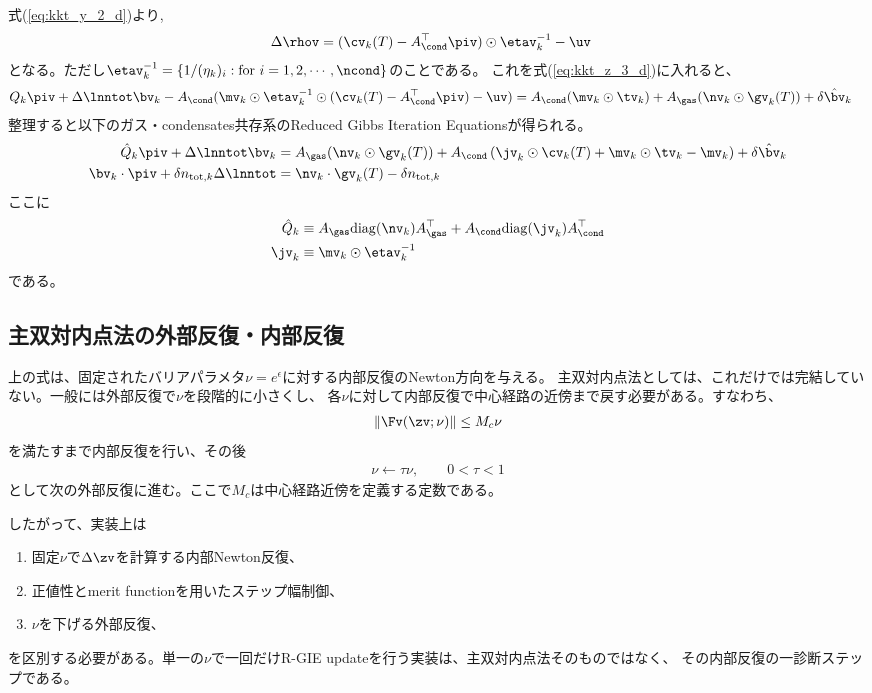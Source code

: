 式(\ref{eq:kkt_y_2_d})より, 
\begin{align}
    \label{eq:kkt_y_2_sd}
      \Delta \rhov &=  ( \cv_k (T) - A_\cond^\top \piv) \odot \etav_k^{-1} - \uv
\end{align}
となる。ただし$\etav_k^{-1} = \{ 1/(\eta_k)_i : \text{for } i=1,2, \cdots, \ncond \}$のことである。 これを式(\ref{eq:kkt_z_3_d})に入れると、
\begin{align}
    Q_k \piv + \Delta \lnntot \bv_k - A_\cond ( \mv_k \odot \etav_k^{-1} \odot  (\cv_k (T) - A_\cond^\top \piv )  - \uv) &= A_\cond ( \mv_k \odot \tv_k ) + A_\gas ( \nv_k \odot \gv_k (T) ) + \delta \hat{\bv}_k
\end{align}
整理すると以下のガス・condensates共存系のReduced Gibbs Iteration Equationsが得られる。
\begin{align}
\hat{Q}_k \piv + \Delta \lnntot \bv_k  &=  A_\gas ( \nv_k \odot \gv_k (T) ) + A_\cond \left(  \jv_k \odot \cv_k (T) + \mv_k \odot \tv_k - \mv_k \right) + \delta \hat{\bv}_k \\
\bv_k \cdot \piv + \delta n_{\mathrm{tot}, k} \Delta \lnntot &= \nv_k \cdot \gv_k(T) - \delta n_{\mathrm{tot}, k}
\end{align}
 ここに
\begin{align}
\hat{Q}_k &\equiv A_\gas \mathrm{diag} (\nv_k) A_\gas^\top + A_\cond \mathrm{diag} (\jv_k) A_\cond^\top \\
\jv_k &\equiv \mv_k \odot \etav_k^{-1}
\end{align}
である。

\subsection*{主双対内点法の外部反復・内部反復}

上の式は、固定されたバリアパラメタ$\nu=e^\epsilon$に対する内部反復のNewton方向を与える。
主双対内点法としては、これだけでは完結していない。一般には外部反復で$\nu$を段階的に小さくし、
各$\nu$に対して内部反復で中心経路の近傍まで戻す必要がある。すなわち、
\begin{align}
    \| \Fv(\zv;\nu) \| \le M_c \nu
\end{align}
を満たすまで内部反復を行い、その後
\begin{align}
    \nu \leftarrow \tau \nu,\qquad 0 < \tau < 1
\end{align}
として次の外部反復に進む。ここで$M_c$は中心経路近傍を定義する定数である。

したがって、実装上は
\begin{enumerate}
    \item 固定$\nu$で$\Delta \zv$を計算する内部Newton反復、
    \item 正値性とmerit functionを用いたステップ幅制御、
    \item $\nu$を下げる外部反復、
\end{enumerate}
を区別する必要がある。単一の$\nu$で一回だけR-GIE updateを行う実装は、主双対内点法そのものではなく、
その内部反復の一診断ステップである。

